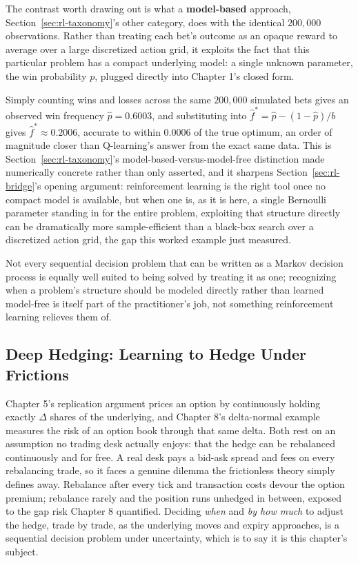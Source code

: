 \documentclass[../ai_in_finance]{subfiles}
\begin{document}
The contrast worth drawing out is what a \textbf{model-based} approach, Section~\ref{sec:rl-taxonomy}'s other category, does with the identical $200{,}000$ observations. Rather than treating each bet's outcome as an opaque reward to average over a large discretized action grid, it exploits the fact that this particular problem has a compact underlying model: a single unknown parameter, the win probability $p$, plugged directly into Chapter 1's closed form.

Simply counting wins and losses across the same $200{,}000$ simulated bets gives an observed win frequency $\hat p=0.6003$, and substituting into $\hat f^*=\hat p-(1-\hat p)/b$ gives $\hat f^*\approx0.2006$, accurate to within $0.0006$ of the true optimum, an order of magnitude closer than Q-learning's answer from the exact same data. This is Section~\ref{sec:rl-taxonomy}'s model-based-versus-model-free distinction made numerically concrete rather than only asserted, and it sharpens Section~\ref{sec:rl-bridge}'s opening argument: reinforcement learning is the right tool once no compact model is available, but when one is, as it is here, a single Bernoulli parameter standing in for the entire problem, exploiting that structure directly can be dramatically more sample-efficient than a black-box search over a discretized action grid, the gap this worked example just measured.

Not every sequential decision problem that can be written as a Markov decision process is equally well suited to being solved by treating it as one; recognizing when a problem's structure should be modeled directly rather than learned model-free is itself part of the practitioner's job, not something reinforcement learning relieves them of.

\subsection{Deep Hedging: Learning to Hedge Under Frictions}
\label{sec:deep-hedging}

Chapter 5's replication argument prices an option by continuously holding exactly $\Delta$ shares of the underlying, and Chapter 8's delta-normal example measures the risk of an option book through that same delta. Both rest on an assumption no trading desk actually enjoys: that the hedge can be rebalanced continuously and for free. A real desk pays a bid-ask spread and fees on every rebalancing trade, so it faces a genuine dilemma the frictionless theory simply defines away. Rebalance after every tick and transaction costs devour the option premium; rebalance rarely and the position runs unhedged in between, exposed to the gap risk Chapter 8 quantified. Deciding \emph{when} and \emph{by how much} to adjust the hedge, trade by trade, as the underlying moves and expiry approaches, is a sequential decision problem under uncertainty, which is to say it is this chapter's subject.
\end{document}
